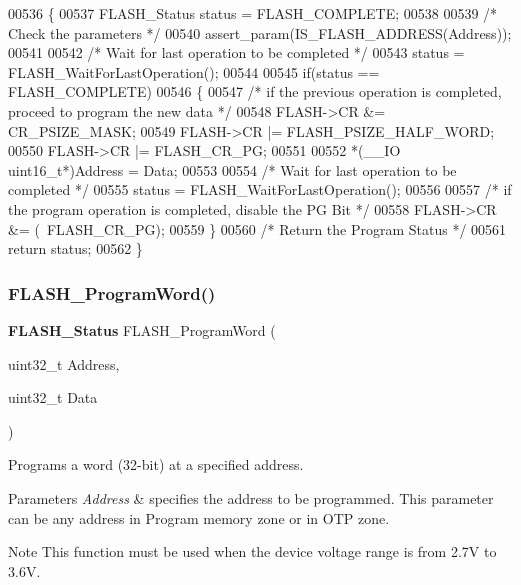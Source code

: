 \begin{DoxyCode}
00536 \{
00537   FLASH_Status status = FLASH_COMPLETE;
00538 
00539   \textcolor{comment}{/* Check the parameters */}
00540   assert_param(IS_FLASH_ADDRESS(Address));
00541 
00542   \textcolor{comment}{/* Wait for last operation to be completed */}
00543   status = FLASH_WaitForLastOperation();
00544   
00545   \textcolor{keywordflow}{if}(status == FLASH_COMPLETE)
00546   \{
00547     \textcolor{comment}{/* if the previous operation is completed, proceed to program the new data */}
00548     FLASH->CR &= CR_PSIZE_MASK;
00549     FLASH->CR |= FLASH_PSIZE_HALF_WORD;
00550     FLASH->CR |= FLASH_CR_PG;
00551   
00552     *(\_\_IO uint16\_t*)Address = Data;
00553         
00554     \textcolor{comment}{/* Wait for last operation to be completed */}
00555     status = FLASH_WaitForLastOperation();
00556 
00557     \textcolor{comment}{/* if the program operation is completed, disable the PG Bit */}
00558     FLASH->CR &= (~FLASH_CR_PG);
00559   \} 
00560   \textcolor{comment}{/* Return the Program Status */}
00561   \textcolor{keywordflow}{return} status;
00562 \}
\end{DoxyCode}
\mbox{\label{group__FLASH__Group2_gaac9a2f400b92537bd42a6bd7cc237b11}} 
\subsubsection{F\+L\+A\+S\+H\+\_\+\+Program\+Word()}
{\footnotesize\ttfamily \textbf{ F\+L\+A\+S\+H\+\_\+\+Status} F\+L\+A\+S\+H\+\_\+\+Program\+Word (\begin{DoxyParamCaption}\item[{uint32\+\_\+t}]{Address,  }\item[{uint32\+\_\+t}]{Data }\end{DoxyParamCaption})}



Programs a word (32-\/bit) at a specified address. 


\begin{DoxyParams}{Parameters}
{\em Address} & specifies the address to be programmed. This parameter can be any address in Program memory zone or in O\+TP zone. \\
\hline
\end{DoxyParams}
\begin{DoxyNote}{Note}
This function must be used when the device voltage range is from 2.\+7V to 3.\+6V. 
\end{DoxyNote}

